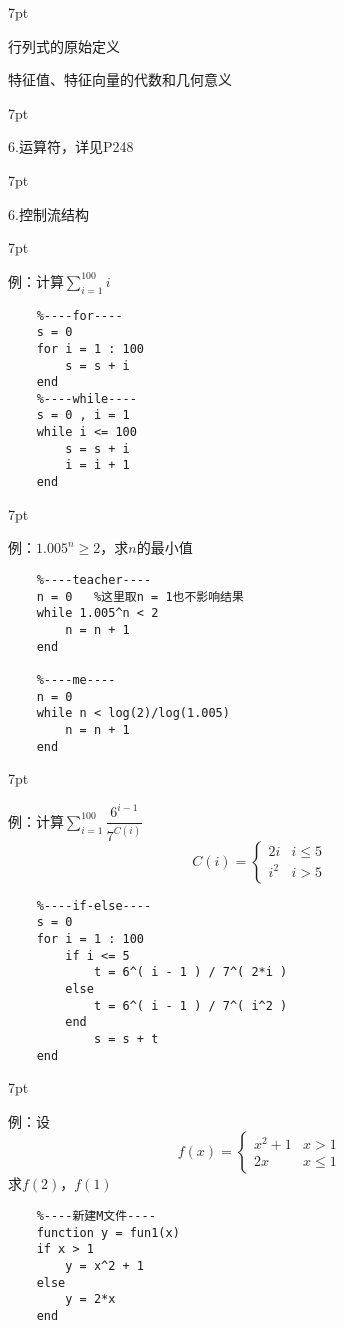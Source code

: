 \documentclass{article} %
\newenvironment{eg}{%
\def\FrameCommand{%
\hspace{1pt}%
{\color{Gray}\vrule width 2pt}%
{\color{egshade}\vrule width 4pt}%
\colorbox{egshade}%
}%
\MakeFramed{\advance\hsize-\width\FrameRestore}%
\noindent\hspace{-4.55pt}%
\begin{adjustwidth}{}{7pt}%
\vspace{2pt}\vspace{2pt}%
\normalfont %
}
{%
\vspace{2pt}\end{adjustwidth}\endMakeFramed%
}
\newenvironment{wa}{%
\def\FrameCommand{%
\hspace{1pt}%
{\color{LightCoral}\vrule width 2pt}%
{\color{washade}\vrule width 4pt}%
\colorbox{washade}%
}%
\MakeFramed{\advance\hsize-\width\FrameRestore}%
\noindent\hspace{-4.55pt}%
\begin{adjustwidth}{}{7pt}%
\vspace{2pt}\vspace{2pt}%
\normalfont %
}
{%
\vspace{2pt}\end{adjustwidth}\endMakeFramed%
}
\begin{document}
\begin{wa}
    行列式的原始定义

    \noindent 特征值、特征向量的代数和几何意义
\end{wa}

\begin{eg}
    6.运算符，详见P248
\end{eg}

\begin{eg}
    6.控制流结构
\end{eg}

\begin{wa}
    例：计算$\sum \limits _{i=1}^{100} i$ 
\end{wa}
\begin{lstlisting}
    %----for----
    s = 0
    for i = 1 : 100
        s = s + i
    end
    %----while----
    s = 0 , i = 1
    while i <= 100
        s = s + i
        i = i + 1
    end
\end{lstlisting}

\begin{wa}
    例：$1.005^{n} \geqslant 2$，求$n$的最小值
\end{wa}
\begin{lstlisting}
    %----teacher----
    n = 0   %这里取n = 1也不影响结果
    while 1.005^n < 2 
        n = n + 1
    end

    %----me----
    n = 0
    while n < log(2)/log(1.005)
        n = n + 1
    end
\end{lstlisting}

\begin{wa}
    例：计算$\sum \limits _{i=1}^{100} \dfrac{6^{i - 1}}{7^{C(i)}}$
    $$C(i) =
    \begin{cases}
        2i & i \leqslant 5 \\
        i^{2} & i > 5
    \end{cases}
    $$
\end{wa}
\begin{lstlisting}
    %----if-else----
    s = 0 
    for i = 1 : 100
        if i <= 5
            t = 6^( i - 1 ) / 7^( 2*i ) 
        else
            t = 6^( i - 1 ) / 7^( i^2 ) 
        end
            s = s + t 
    end
\end{lstlisting}

\begin{wa}
    例：设
    $$f(x) = 
    \begin{cases}
        x^{2} + 1 & x > 1\\
        2x & x \leqslant 1
    \end{cases}
    $$
    \indent 求$f(2)$，$f(1)$
\end{wa}
\begin{lstlisting}
    %----新建M文件----
    function y = fun1(x)
    if x > 1
        y = x^2 + 1
    else
        y = 2*x
    end
\end{lstlisting}
\end{document}
